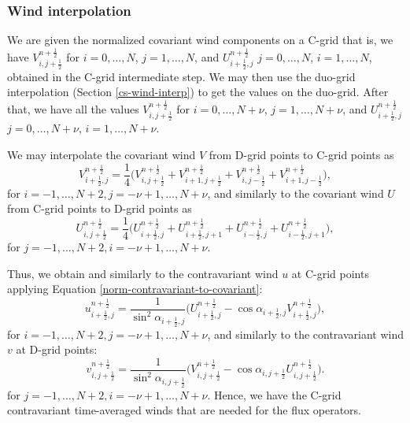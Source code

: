 \subsubsection{Wind interpolation}
We are given  the normalized covariant wind components on a C-grid
that is, we have $V_{i,j+\frac{1}{2}}^{n+\frac{1}{2}}$ for $i=0,\ldots,N$, $j=1,\ldots,N$, 
and $U_{i+\frac{1}{2},j}^{n+\frac{1}{2}}$ $j=0,\ldots,N$, $i=1,\ldots,N$, obtained in the C-grid intermediate step.
We may then use the duo-grid interpolation (Section \ref{cs-wind-interp}) to get the values on the duo-grid.
After that, we have all the values 
$V_{i,j+\frac{1}{2}}^{n+\frac{1}{2}}$ for $i=0,\ldots,N+\nu$, $j=1,\ldots,N+\nu$, 
and $U_{i+\frac{1}{2},j}^{n+\frac{1}{2}}$ $j=0,\ldots,N+\nu$, $i=1,\ldots,N+\nu$.

We may interpolate the covariant wind $V$ from D-grid points to C-grid points as
\begin{equation}
\label{cova-2-contra-V}
V_{i+\frac{1}{2},j}^{n+\frac{1}{2}}	= \frac{1}{4}\big(
V_{i,j+\frac{1}{2}}^{n+\frac{1}{2}} + V_{i+1,j+\frac{1}{2}}^{n+\frac{1}{2}} + 
V_{i,j-\frac{1}{2}}^{n+\frac{1}{2}} + V_{i+1,j-\frac{1}{2}}^{n+\frac{1}{2}}
\big),
\end{equation}
for $i=-1,\ldots,N+2, j=-\nu+1,\ldots,N+\nu$,	
and similarly to the covariant wind $U$ from C-grid points to D-grid points as
\begin{equation}
	\label{cova-2-contra-U}
	U_{i,j+\frac{1}{2}}^{n+\frac{1}{2}}	= \frac{1}{4}\big(
	U_{i+\frac{1}{2},j}^{n+\frac{1}{2}} + U_{i+\frac{1}{2},j+1}^{n+\frac{1}{2}} + 
	U_{i-\frac{1}{2},j}^{n+\frac{1}{2}} + U_{i-\frac{1}{2},j+1}^{n+\frac{1}{2}}
	\big),
\end{equation}
for $j=-1,\ldots,N+2, i=-\nu+1,\ldots,N+\nu$.

Thus, we obtain and similarly to the contravariant wind $u$ at C-grid points applying Equation \eqref{norm-contravariant-to-covariant}:
\begin{equation}
	\label{cova-2-contra-UU}
	u_{i+\frac{1}{2},j}^{n+\frac{1}{2}}	= \frac{1}{\sin^2{\alpha_{i+\frac{1}{2},j}}}\bigg(
	U_{i+\frac{1}{2},j}^{n+\frac{1}{2}} - \cos{\alpha_{i+\frac{1}{2},j}}V_{i+\frac{1}{2},j}^{n+\frac{1}{2}}\bigg),
\end{equation}
for $i=-1,\ldots,N+2, j=-\nu+1,\ldots,N+\nu$, and similarly to the contravariant wind $v$ at D-grid points:
\begin{equation}
	\label{cova-2-contra-VV}
	v_{i,j+\frac{1}{2}}^{n+\frac{1}{2}}	= \frac{1}{\sin^2{\alpha_{i,j+\frac{1}{2}}}}\bigg(
	V_{i,j+\frac{1}{2}}^{n+\frac{1}{2}} - \cos{\alpha_{i,j+\frac{1}{2}}}U_{i,j+\frac{1}{2}}^{n+\frac{1}{2}}\bigg).
\end{equation}
for $j=-1,\ldots,N+2, i=-\nu+1,\ldots,N+\nu$.
Hence, we have the C-grid contravariant time-averaged winds that are needed for the flux operators.

